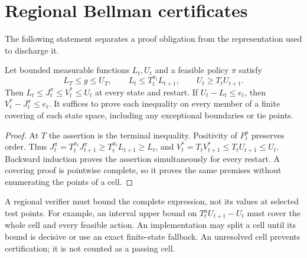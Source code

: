 \section{Regional Bellman certificates}\label{sec:regional30}
The following statement separates a proof obligation from the representation used to discharge it.
\begin{theorem}\label{thm:regional30}
Let bounded measurable functions $L_t,U_t$ and a feasible policy $\pi$ satisfy
\begin{equation}\label{eq:witness30}
 L_T\le g\le U_T,\qquad L_t\le T_t^{\pi_t}L_{t+1},\qquad
 U_t\ge T_t U_{t+1}.
\end{equation}
Then $L_t\le J_t^\pi\le V_t^*\le U_t$ at every state and restart. If $U_t-L_t\le e_t$, then $V_t^*-J_t^\pi\le e_t$. It suffices to prove each inequality on every member of a finite covering of each state space, including any exceptional boundaries or tie points.
\end{theorem}
\begin{proof}
At $T$ the assertion is the terminal inequality. Positivity of $P_t^a$ preserves order. Thus $J_t^\pi=T_t^{\pi_t}J_{t+1}^\pi\ge T_t^{\pi_t}L_{t+1}\ge L_t$, and $V_t^*=T_tV_{t+1}^*\le T_tU_{t+1}\le U_t$. Backward induction proves the assertion simultaneously for every restart. A covering proof is pointwise complete, so it proves the same premises without enumerating the points of a cell.\end{proof}

A regional verifier must bound the complete expression, not its values at selected test points. For example, an interval upper bound on $T_t^aU_{t+1}-U_t$ must cover the whole cell and every feasible action. An implementation may split a cell until its bound is decisive or use an exact finite-state fallback. An unresolved cell prevents certification; it is not counted as a passing cell.

